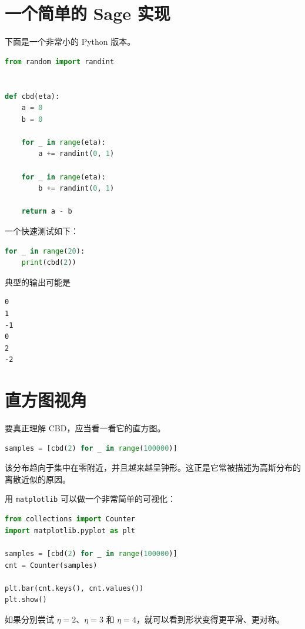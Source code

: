 \section{一个简单的 Sage 实现}

下面是一个非常小的 Python 版本。

\begin{lstlisting}[language=Python]
from random import randint


def cbd(eta):
    a = 0
    b = 0

    for _ in range(eta):
        a += randint(0, 1)

    for _ in range(eta):
        b += randint(0, 1)

    return a - b
\end{lstlisting}

一个快速测试如下：

\begin{lstlisting}[language=Python]
for _ in range(20):
    print(cbd(2))
\end{lstlisting}

典型的输出可能是

\begin{verbatim}
0
1
-1
0
2
-2
\end{verbatim}

\section{直方图视角}

要真正理解 CBD，应当看一看它的直方图。

\begin{lstlisting}[language=Python]
samples = [cbd(2) for _ in range(100000)]
\end{lstlisting}

该分布趋向于集中在零附近，并且越来越呈钟形。这正是它常被描述为高斯分布的离散近似的原因。

用 \texttt{matplotlib} 可以做一个非常简单的可视化：

\begin{lstlisting}[language=Python]
from collections import Counter
import matplotlib.pyplot as plt

samples = [cbd(2) for _ in range(100000)]
cnt = Counter(samples)

plt.bar(cnt.keys(), cnt.values())
plt.show()
\end{lstlisting}

如果分别尝试 \(\eta=2\)、\(\eta=3\) 和 \(\eta=4\)，就可以看到形状变得更平滑、更对称。

